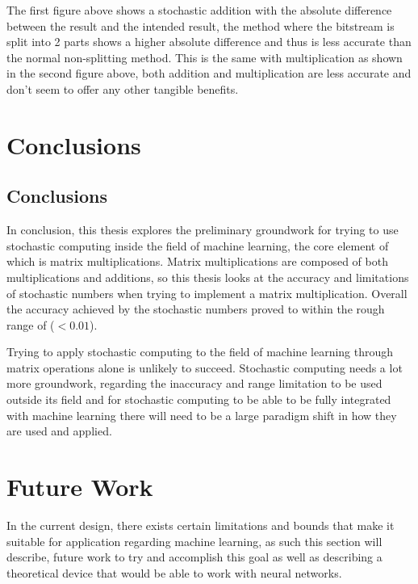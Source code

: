 \documentclass[a4paper,oneside,phd,etd]{BYUPhys}
\begin{document}
The first figure above shows a stochastic addition with the absolute difference between the result and the intended result, the method where the bitstream is split into 2 parts shows a higher absolute difference and thus is less accurate than the normal non-splitting method. This is the same with multiplication as shown in the second figure above, both addition and multiplication are less accurate and don't seem to offer any other tangible benefits.

\chapter{Conclusions}
\label{chap:Conclusions}

\section{Conclusions}
\label{sec:ConclusionsConclusions}
In conclusion, this thesis explores the preliminary groundwork for trying to use stochastic computing inside the field of machine learning, the core element of which is matrix multiplications. Matrix multiplications are composed of both multiplications and additions, so this thesis looks at the accuracy and limitations of stochastic numbers when trying to implement a matrix multiplication. Overall the accuracy achieved by the stochastic numbers proved to within the rough range of ($<0.01$). %

Trying to apply stochastic computing to the field of machine learning through matrix operations alone is unlikely to succeed. Stochastic computing needs a lot more groundwork, regarding the inaccuracy and range limitation to be used outside its field and for stochastic computing to be able to be fully integrated with machine learning there will need to be a large paradigm shift in how they are used and applied.

\chapter{Future Work}
In the current design, there exists certain limitations and bounds that make it suitable for application regarding machine learning, as such this section will describe, future work to try and accomplish this goal as well as describing a theoretical device that would be able to work with neural networks.
\end{document}
